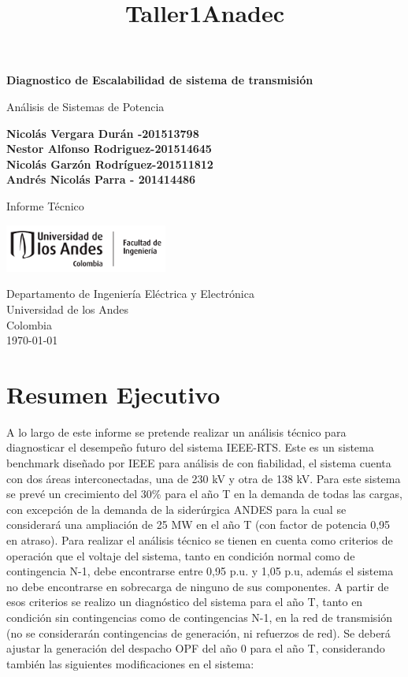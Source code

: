 \documentclass{article}
\title{Taller1Anadec}
\begin{document}
\begin{titlepage}
   \begin{center}
       \vspace*{1cm}
        \Huge
       \textbf{Diagnostico de Escalabilidad de sistema de transmisión}
        
       \vspace{0.5cm}
       \Large
        Análisis de Sistemas de Potencia
 
       \vspace{1.5cm}
 
       \textbf{Nicolás Vergara Durán -201513798\\Nestor Alfonso Rodriguez-201514645\\Nicolás Garzón Rodríguez-201511812\\Andrés Nicolás Parra - 201414486}
 
       \vfill
 
       Informe Técnico
 
       \vspace{0.8cm}
 
       \includegraphics[width=0.4\textwidth]{LogoUniAndes.png}
 
       Departamento de Ingeniería Eléctrica y Electrónica\\
       Universidad de los Andes\\
       Colombia\\
       \today
 
   \end{center}
\end{titlepage}
\tableofcontents
\listoffigures
\listoftables
\newpage
\section*{Resumen Ejecutivo}


A lo largo de este informe se pretende realizar un análisis técnico para diagnosticar el desempeño futuro del sistema IEEE-RTS. Este es un sistema benchmark diseñado por IEEE para análisis de con fiabilidad, el sistema cuenta con dos áreas interconectadas, una de 230 kV y otra de 138 kV. Para este sistema se prevé un crecimiento del 30\% para el año T en la demanda de todas las cargas, con excepción de la demanda de la siderúrgica ANDES para la cual se considerará una ampliación de 25 MW en el año T (con factor de potencia 0,95 en atraso). Para realizar el análisis técnico se tienen en cuenta como criterios de operación  que el voltaje  del sistema, tanto en condición normal como de contingencia N-1, debe encontrarse entre 0,95 p.u. y 1,05 p.u, además el sistema no debe encontrarse en sobrecarga de ninguno de sus componentes. A partir de esos criterios se realizo  un diagnóstico del sistema para el año T, tanto en condición sin contingencias como de contingencias N-1, en la red de transmisión (no se considerarán contingencias de generación, ni refuerzos de red). Se deberá ajustar la generación del despacho OPF del año 0 para el año T, considerando también las siguientes modificaciones en el sistema:
\end{document}
